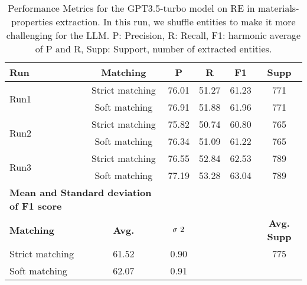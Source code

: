 \begin{table}[htbp]
    \small
    \centering
    \caption{Performance Metrics for the GPT3.5-turbo model on RE in materials-properties extraction. In this run, we shuffle entities to make it more challenging for the LLM. P: Precision, R: Recall, F1: harmonic average of P and R, Supp: Support, number of extracted entities.}
    \begin{tabular}{lccccc}
        \toprule
        \textbf{Run} & \textbf{Matching} & \textbf{P} & \textbf{R} & \textbf{F1} & \textbf{Supp} \\
        \midrule
        \multirow{2}{*}{Run1} & Strict matching & 76.01 & 51.27 & 61.23 & 771 \\
        & Soft matching & 76.91 & 51.88 & 61.96 & 771  \\
        \midrule
        \multirow{2}{*}{Run2} & Strict matching & 75.82 & 50.74 & 60.80 & 765 \\
        & Soft matching & 76.34 & 51.09 & 61.22 & 765 \\
        \midrule
        \multirow{2}{*}{Run3} & Strict matching & 76.55 & 52.84 & 62.53 & 789 \\
        & Soft matching & 77.19 & 53.28 & 63.04 & 789  \\
        \midrule
        \multicolumn{2}{l}{\textbf{Mean and Standard deviation of F1 score}} & & & & \\
        \midrule
        \textbf{Matching} & \textbf{Avg.} & $\sigma\textsuperscript{2}$ & & & \textbf{Avg. Supp}\\
        Strict matching & 61.52 & 0.90 & & & 775 \\
        Soft matching & 62.07 & 0.91 & & \\
        \bottomrule
    \end{tabular}
\end{table}


